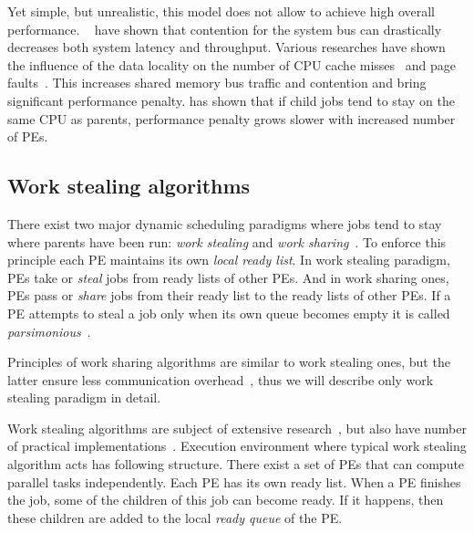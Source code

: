 Yet simple, but unrealistic, this model does not allow to achieve high
overall
performance. \citeauthor{anderson1989performance}~\cite{anderson1989performance}
have  shown that contention for the
system bus can drastically decreases both system latency and
throughput. Various researches have shown the influence of the data
locality on the number of CPU cache
misses~\cite{Spoonhower:2009:BNP:1583991.1584019,Herlihy:2014:WFC:2555243.2555257,Squillante1993}
and page faults~\cite{Blumofe:1996:ADD:237502.237574}. This increases
shared memory bus traffic and contention and bring significant
performance penalty. \cite{Squillante1993} has shown that if child
jobs tend to stay on the same CPU as parents, performance penalty
grows slower with increased number of PEs.

\subsection{Work stealing algorithms}
\label{sec:work_stealing}

There exist two major dynamic scheduling paradigms where jobs tend to
stay where parents have been run: \emph{work stealing} and \emph{work
  sharing}~\cite{Blumofe:1999:SMC:324133.324234}. To enforce this
principle each PE maintains its own \emph{local ready list}. In work
stealing paradigm, PEs take or \emph{steal} jobs from ready lists of
other PEs. And in work sharing ones, PEs pass or \emph{share} jobs
from their ready list to the ready lists of other PEs. If a PE
attempts to steal a job only when its own queue becomes empty it is
called \emph{parsimonious}~\cite{Spoonhower:2009:BNP:1583991.1584019}.

Principles of work sharing algorithms are similar to work stealing
ones, but the latter ensure less communication
overhead~\cite{Blumofe:1999:SMC:324133.324234}, thus we will describe
only work stealing paradigm in detail.

Work stealing algorithms are subject of extensive
research~\cite{Spoonhower:2009:BNP:1583991.1584019,
  Blumofe:1999:SMC:324133.324234, Acar:2000:DLW:341800.341801,
  Arora:1998:TSM:277651.277678}, but also have number of practical
implementations~\cite{Halstead:1984:IML:800055.802017,
  Blumofe:1995:CEM:209937.209958}.  Execution environment where
typical work stealing algorithm acts has following structure. There
exist a set of PEs that can compute parallel tasks independently. Each
PE has its own ready list. When a PE finishes the job, some of the
children of this job can become ready. If it happens, then these
children are added to the local \emph{ready queue} of the PE.

